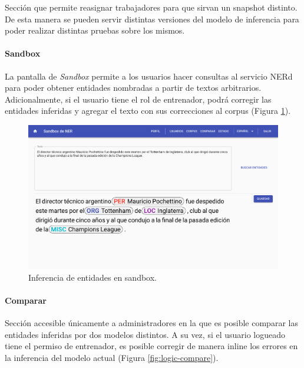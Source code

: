 \documentclass[12pt,a4paper,]{scrartcl}
\let\oldparagraph\paragraph
\renewcommand{\paragraph}[1]{\oldparagraph{#1}\mbox{}}
\begin{document}
Sección que permite reasignar trabajadores para que sirvan un snapshot distinto. De esta manera se pueden servir distintas versiones del modelo de inferencia para poder realizar distintas pruebas sobre los mismos.

\hypertarget{sandbox}{%
\paragraph{Sandbox}\label{sandbox}}

La pantalla de \emph{Sandbox} permite a los usuarios hacer consultas al servicio NERd para poder obtener entidades nombradas a partir de textos arbitrarios.
Adicionalmente, si el usuario tiene el rol de entrenador, podrá corregir las entidades inferidas y agregar el texto con sus correcciones al corpus (Figura \ref{fig:logic-sandbox}).

\begin{figure}[H]

{\centering \includegraphics{assets/logic/sandbox.pdf} 

}

\caption{Inferencia de entidades en sandbox.}\label{fig:logic-sandbox}
\end{figure}

\hypertarget{comparar}{%
\paragraph{Comparar}\label{comparar}}

Sección accesible únicamente a administradores en la que es posible comparar las entidades inferidas por dos modelos distintos. A su vez, si el usuario logueado tiene el permiso de entrenador, es posible corregir de manera inline los errores en la inferencia del modelo actual (Figura \ref{fig:logic-compare}).
\end{document}
